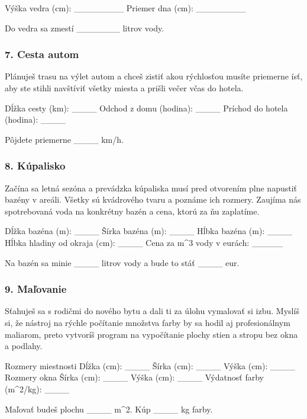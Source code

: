 \begin{code}
Výška vedra (cm): ________
Priemer dna (cm): ________

Do vedra sa zmestí _______ litrov vody.
\end{code}

\subsubsection*{7. Cesta autom}
Plánuješ trasu na výlet autom a chceš zistiť akou rýchlosťou musíte priemerne ísť, aby ste stihli navštíviť všetky miesta a prišli večer včas do hotela.

\begin{code}
Dĺžka cesty (km): ____
Odchod z domu (hodina): ____
Príchod do hotela (hodina): ____

Pôjdete priemerne ____ km/h.
\end{code}

\subsubsection*{8. Kúpalisko}
Začína sa letná sezóna a prevádzka kúpaliska musí pred otvorením plne napustiť bazény v areáli. Všetky sú kvádrového tvaru a poznáme ich rozmery. Zaujíma nás spotrebovaná voda na konkrétny bazén a cena, ktorú za ňu zaplatíme.

\begin{code}
Dĺžka bazéna (m): ____
Šírka bazéna (m): ____
Hĺbka bazéna (m): ____
Hĺbka hladiny od okraja (cm): ____
Cena za m^3 vody v eurách: _____

Na bazén sa minie ____ litrov vody a bude to stáť ____ eur.
\end{code}

\subsubsection*{9. Maľovanie}
Sťahuješ sa s rodičmi do nového bytu a dali ti za úlohu vymalovať si izbu. Myslíš si, že nástroj na rýchle počítanie množstva farby by sa hodil aj profesionálnym maliarom, preto vytvoríš program na vypočítanie plochy stien a stropu bez okna a podlahy.

\begin{code}
Rozmery miestnosti
Dĺžka (cm): ____
Šírka (cm): ____
Výška (cm): ____
Rozmery okna
Šírka (cm): ____
Výška (cm): ____
Výdatnosť farby (m^2/kg): ____

Maľovať budeš plochu ____ m^2. Kúp ____ kg farby.
\end{code}

